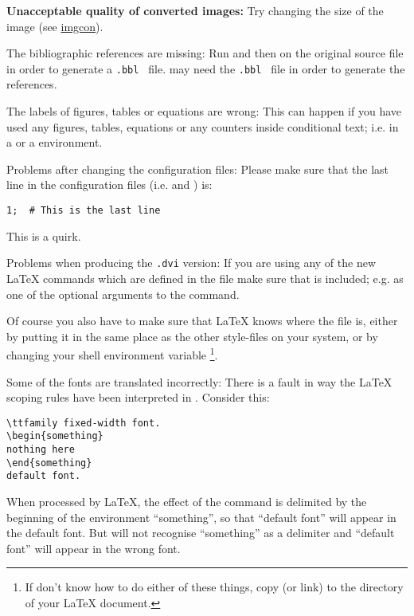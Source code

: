 \begin{htmllist}
\item [\textbf{Unacceptable quality of converted images: }]
Try changing the size of the image 
(see \hyperref{image conversion}{Section~}{}{imgcon}).

\item [The bibliographic references are missing: ]
Run  and then  on the original source file in
order to generate a \texttt{.bbl } file. 
\latextohtml{} may need the \texttt{.bbl } file in order to generate 
the references.


\item [The labels of figures, tables or equations are wrong: ]
This can happen if you have used any figures, tables, equations or
any counters inside conditional text; i.e. in a  
or a  environment. 


\item [Problems after changing the configuration files: ]
Please make sure that the last line in the configuration files 
(i.e.  and ) is:
\begin{small}
\begin{verbatim}
1;	# This is the last line
\end{verbatim}
\end{small}
This is a \Perl{} quirk.

\item [Problems when producing the \texttt{.dvi} version: \label{htmlsty}]
If you are using any of the new \LaTeX{} commands which are defined in 
the  file make sure that  is included;
e.g. as one of the optional arguments to the  command.

Of course you also have to make sure that \LaTeX{} knows where the 
file is, either by putting it in the same place as the other style-files on
your system, or by changing your  shell environment variable%
\footnote{If don't know how to do either of these things, copy (or link)  
to the directory of your \LaTeX{} document.}.

\item [Some of the fonts are translated incorrectly: ]
There is a fault in way the \LaTeX{} scoping rules have been 
interpreted in \latextohtml. Consider this:
\begin{small}
\begin{verbatim}
\ttfamily fixed-width font.
\begin{something}
nothing here
\end{something}
default font.
\end{verbatim}
\end{small}
When processed by \LaTeX, the effect of the  command is
delimited by the beginning of the environment ``something'',
so that ``default font'' will appear in the default font. 
But \latextohtml{} will not recognise
``something'' as a delimiter and ``default font'' will appear in the
wrong font. 


\end{htmllist}

